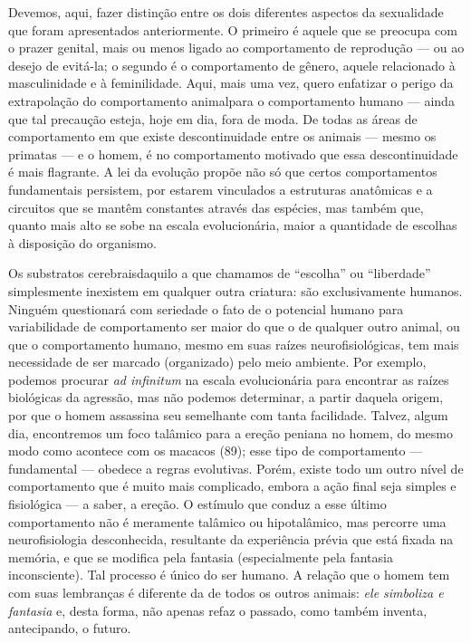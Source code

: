  Devemos, aqui, fazer distinção entre os dois diferentes aspectos da
sexualidade que foram apresentados anteriormente. O primeiro é aquele
que se preocupa com o prazer genital, mais ou menos ligado ao
comportamento de reprodução --- ou ao desejo de evitá-la; o segundo é o
comportamento de gênero,\idxiden{} aquele relacionado à masculinidade e à
feminilidade. Aqui, mais uma vez, quero enfatizar o perigo da
extrapolação do comportamento animal\idxanimvers[|(] para o comportamento humano ---
ainda que tal precaução esteja, hoje em dia, fora de moda. De todas as
áreas de comportamento em que existe descontinuidade entre os animais ---
 mesmo os primatas --- e o homem, é no comportamento motivado que essa
descontinuidade é mais flagrante. A lei da evolução propõe não só que
certos comportamentos fundamentais persistem, por estarem vinculados a
estruturas anatômicas e a circuitos que se mantêm constantes através
das espécies, mas também que, quanto mais alto se sobe na escala
evolucionária, maior a quantidade de escolhas à disposição do
organismo.

 Os substratos cerebrais\idxcereb[|(] daquilo a que chamamos de
``escolha'' ou ``liberdade'' simplesmente inexistem em
qualquer outra criatura: são exclusivamente humanos. Ninguém
questionará com seriedade o fato de o potencial humano para
variabilidade de comportamento ser maior do que o de qualquer outro
animal, ou que o comportamento humano, mesmo em suas raízes
neurofisiológicas, tem mais necessidade de ser marcado (organizado)
pelo meio ambiente. Por exemplo, podemos procurar \textit{ad infinitum}
na escala evolucionária para encontrar as raízes biológicas da
agressão,\idxagres{} mas não podemos determinar, a partir daquela origem, por que
o homem assassina seu semelhante com tanta facilidade. Talvez, algum
dia, encontremos um foco talâmico para a ereção peniana no homem, do
mesmo modo como acontece com os macacos (89); esse tipo de
comportamento --- fundamental --- obedece a regras evolutivas. Porém,
existe todo um outro nível de comportamento que é muito mais
complicado, embora a ação final seja simples e fisiológica --- a saber, a
ereção. O estímulo que conduz a esse último comportamento não é
meramente talâmico ou hipotalâmico, mas percorre uma neurofisiologia
desconhecida, resultante da experiência prévia que está fixada na
memória, e que se modifica pela fantasia\idxfanta{} (especialmente pela fantasia
inconsciente). Tal processo é único do ser humano. A relação que o
homem tem com suas lembranças é diferente da de todos os outros
animais: \textit{ele simboliza e fantasia} e, desta forma, não apenas
refaz o passado, como também inventa, antecipando, o futuro.

